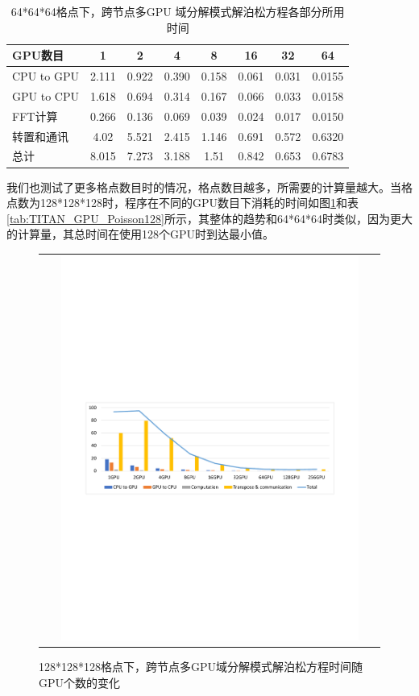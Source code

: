 \begin{table}
  \centering
  \begin{tabular}{|l|c|c|c|c|c|c|c|}
    \hline
    GPU数目	    &1	    &2	    &4	    &8 	    &16	    &32  	&64   \\
    \hline
    CPU to GPU	&2.111	&0.922	&0.390	&0.158	&0.061	&0.031	&0.0155 \\
    GPU to CPU	&1.618	&0.694	&0.314	&0.167	&0.066	&0.033	&0.0158 \\
    FFT计算  	&0.266	&0.136	&0.069	&0.039	&0.024	&0.017	&0.0150 \\
    转置和通讯	&4.02	&5.521	&2.415	&1.146	&0.691	&0.572	&0.6320 \\
    总计	    &8.015	&7.273	&3.188	&1.51	&0.842	&0.653	&0.6783 \\
    \hline
  \end{tabular}
  \caption{64*64*64格点下，跨节点多GPU 域分解模式解泊松方程各部分所用时间}
  \label{tab:TITAN_GPU_Poisson64}
\end{table}

我们也测试了更多格点数目时的情况，格点数目越多，所需要的计算量越大。当格点数为128*128*128时，程序在不同的GPU数目下消耗的时间如图\ref{fig:TITAN_GPU_Poisson128}和表\ref{tab:TITAN_GPU_Poisson128}所示，其整体的趋势和64*64*64时类似，因为更大的计算量，其总时间在使用128个GPU时到达最小值。

\begin{figure}[!htb]
  \centering
  \begin{tabular}{|l|l|}
    \multicolumn{2}{c}{
    \includegraphics[width=0.9\textwidth]{Img/domain_decomposition_Titan128.pdf}} \\
  \end{tabular}
  \caption{128*128*128格点下，跨节点多GPU域分解模式解泊松方程时间随GPU个数的变化}
  \label{fig:TITAN_GPU_Poisson128}
\end{figure}


